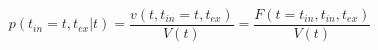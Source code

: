 \begin{equation}
p(t_{in}=t,t_{ex}|t)  = \frac{v(t,t_{in}=t,t_{ex})}{V(t)}= \frac{F(t=t_{in},t_{in},t_{ex})}{V(t)}
\end{equation}